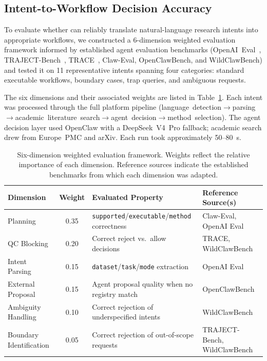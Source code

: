 
\subsection{Intent-to-Workflow Decision Accuracy}

To evaluate whether \dentalclaw{} can reliably translate natural-language research
intents into appropriate workflows, we constructed a 6-dimension weighted evaluation
framework informed by established agent evaluation benchmarks
(OpenAI~Eval~\cite{openai2024}, TRAJECT-Bench~\cite{traject2025},
TRACE~\cite{trace2025}, Claw-Eval, OpenClawBench, and WildClawBench) and tested it
on 11 representative intents spanning four categories: standard executable workflows,
boundary cases, trap queries, and ambiguous requests.

The six dimensions and their associated weights are listed in Table~\ref{tab:eval_dims}.
Each intent was processed through the full platform pipeline
(language~detection$\rightarrow$parsing$\rightarrow$academic~literature~search$\rightarrow$agent~decision$\rightarrow$method~selection).
The agent decision layer used OpenClaw with a DeepSeek~V4~Pro fallback; academic
search drew from Europe~PMC and arXiv. Each run took approximately 50--80~s.

\begin{table}[!t]
\centering
\caption{Six-dimension weighted evaluation framework. Weights reflect the relative
importance of each dimension. Reference sources indicate the established benchmarks
from which each dimension was adapted.}
\label{tab:eval_dims}
\footnotesize
\begin{tabular}{@{}p{3.0cm} c p{5.5cm} p{4.5cm}@{}}
\hline
\textbf{Dimension} & \textbf{Weight} & \textbf{Evaluated Property} & \textbf{Reference Source(s)} \\
\hline
Planning   & 0.35 & \texttt{supported}/\texttt{executable}/\texttt{method} correctness & Claw-Eval, OpenAI Eval \\
QC Blocking & 0.20 & Correct reject vs.\ allow decisions  & TRACE, WildClawBench \\
Intent Parsing & 0.15 & \texttt{dataset}/\texttt{task}/\texttt{mode} extraction  & OpenAI Eval \\
External Proposal & 0.15 & Agent proposal quality when no registry match & OpenClawBench \\
Ambiguity Handling & 0.10 & Correct rejection of underspecified intents  & WildClawBench \\
Boundary Identification & 0.05 & Correct rejection of out-of-scope requests  & TRAJECT-Bench, WildClawBench \\
\hline
\end{tabular}
\end{table}

